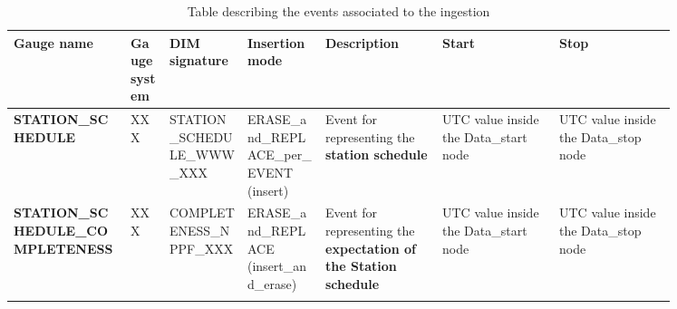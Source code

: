 \begin{landscape}
\begin{longtable}{|M{0.15\linewidth}|M{0.05\linewidth}|M{0.10\linewidth}|M{0.10\linewidth}|M{0.15\linewidth}|M{0.15\linewidth}|M{0.15\linewidth}|}
\hline \textbf{Gauge name} & \textbf{Gauge system} & \textbf{DIM signature} & \textbf{Insertion mode} & \textbf{Description} & \textbf{Start} & \textbf{Stop} \\ \hline
\textbf{STATION\_SCHEDULE} & XXX & STATION\_SCHEDULE\_WWW\_XXX & ERASE\_and\_REPLACE\_per\_EVENT (insert) & Event for representing the \textbf{station schedule} & UTC value inside the Data\_start node & UTC value inside the Data\_stop node  \\ \hline
\textbf{STATION\_SCHEDULE\_COMPLETENESS} & XXX & \- COMPLETENESS\_NPPF\_XXX & ERASE\_and\_REPLACE (insert\_and\_erase) & Event for representing the \textbf{expectation of the Station schedule} & UTC value inside the Data\_start node & UTC value inside the Data\_stop node  \\ \hline
\caption{Table describing the events associated to the ingestion}
\label{tb:description_events_ingestion_station_schedule}
\end{longtable}
\end{landscape}
